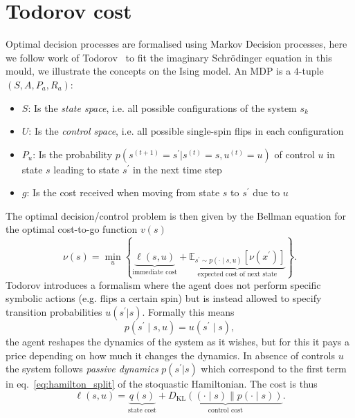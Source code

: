 \section{Todorov cost}
\label{app:todorov-cost}
Optimal decision processes are formalised using Markov Decision processes, here we follow work of Todorov~\cite{todorov2007linearly, todorov2009efficient} to fit the imaginary Schr\" odinger equation in this mould, we illustrate the concepts on the Ising model. An MDP is a $4$-tuple $\left(S, A, P_{a}, R_{a}\right)$:
\begin{itemize}
	\item $S$: Is the \emph{state space}, i.e. all possible configurations of the system $s_k$
	\item $U$: Is the \emph{control space}, i.e. all possible single-spin flips in each configuration
	\item $P_u$: Is the probability  $p(s^{(t+1)} = s^\prime | s^{(t)} = s, u^{(t)} = u)$ of control $u$ in state $s$ leading to state $s^\prime$ in the next time step
	\item $g$: Is the cost received when moving from state $s$ to $s^\prime$ due to $u$
\end{itemize}
The optimal decision/control problem is then given by the Bellman equation for the optimal cost-to-go function $v(s)$
\begin{equation}
	\nu(s)=\min _{u}\left\{
	\underbrace{\ell(s, u)}_{\text{immediate cost}}
	+
	\underbrace{\mathbb{E}_{s^{\prime} \sim p(\cdot \mid s, u)}\left[\nu\left(x^{\prime}\right)\right]}_{\text{expected cost of next state}}
	\right\}.
\end{equation}
Todorov introduces a formalism where the agent does not perform specific symbolic actions (e.g. flips a certain spin) but is instead allowed to specify transition probabilities $u(s^\prime|s)$. Formally this means 
\begin{equation}
	p\left(s^{\prime} \mid s, u\right)=u\left(s^{\prime} \mid s\right),
\end{equation}
the agent reshapes the dynamics of the system as it wishes, but for this it pays a price depending on how much it changes the dynamics. In absence of controls $u$ the system follows \emph{passive dynamics} $p(s^\prime | s)$ which correspond to the first term in eq.~\eqref{eq:hamilton_split} of the stoquastic Hamiltonian. The cost is thus
\begin{equation}
	\ell(s, u)=\underbrace{q(s)}_{\text{state cost}}+\underbrace{D_\mathrm{KL}((\cdot \mid s) \| p(\cdot \mid s))}_{\text{control cost}}.
\end{equation}
